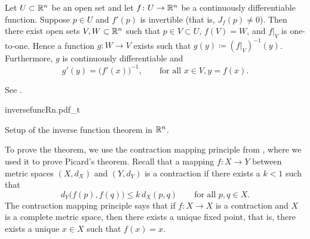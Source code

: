 \begin{thm}
\label{thm:inverse}
Let $U \subset {\mathbb{R}}^n$ be an open set and let
$f \colon U \to {\mathbb{R}}^n$ be a continuously differentiable function.
Suppose $p \in U$ and $f'(p)$ is invertible
(that is, $J_f(p) \not=0$).
Then there exist open sets $V, W \subset {\mathbb{R}}^n$ such that
$p \in V \subset U$, $f(V) = W$, and $f|_V$ is one-to-one.  
Hence a function $g \colon W \to V$ exists such that
$g(y) \coloneqq (f|_V)^{-1}(y)$.
Furthermore, $g$ is continuously differentiable
and 
\begin{equation*}
g'(y) = {\bigl(f'(x)\bigr)}^{-1}, \qquad \text{for all } x \in V, y = f(x).
\end{equation*}
\end{thm}
See .

\begin{myfigureht}
{inversefuncRn.pdf_t}
\caption{Setup of the inverse function theorem in ${\mathbb{R}}^n$.\label{fig:inversefuncRn}}
\end{myfigureht}

To prove the theorem, we use the contraction mapping
principle from
,
where we used it
to prove Picard's theorem.
Recall that a mapping $f \colon X \to Y$ between metric
spaces $(X,d_X)$ and $(Y,d_Y)$ is a contraction 
if there exists a $k < 1$ such that
\begin{equation*}
d_Y\bigl(f(p),f(q)\bigr) \leq k \, d_X(p,q)
\qquad \text{for all } p,q \in X.
\end{equation*}
The contraction mapping principle says that if $f \colon X \to X$
is a contraction and $X$ is a complete metric space,
then there exists a unique fixed point, that is,
there exists a unique $x \in X$ such that $f(x) = x$.

